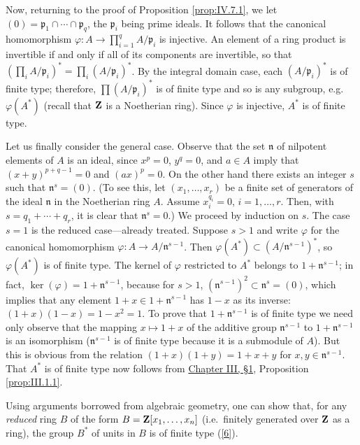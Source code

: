 Now, returning to the proof of Proposition \ref{prop:IV.7.1}, we let
$(0)=\mathfrak{p}_{1}\cap\cdots\cap\mathfrak{p}_{q}$, the $\mathfrak{p}_{i}$
being prime ideals. It follows that the canonical homomorphism
$\varphi:A\to\prod_{i=1}^{q}A/\mathfrak{p}_{i}$ is injective. An element of a
ring product is invertible if and only if all of its components are
invertible, so that
$(\prod_{i}A/\mathfrak{p}_{i})^{*}=\prod_{i}(A/\mathfrak{p}_{i})^{*}$. By
the integral domain case, each $(A/\mathfrak{p}_{i})^{*}$ is of finite type;
therefore, $\prod(A/\mathfrak{p}_{i})^{*}$ is of finite type and so is any
subgroup, e.g.\ $\varphi(A^{*})$ (recall that $\mathbf{Z}$ is a Noetherian ring).
Since $\varphi$ is injective, $A^{*}$ is of finite type.

Let us finally consider the general case. Observe that the set
$\mathfrak{n}$ of nilpotent elements of $A$ is an ideal, since $x^{p}=0$,
$y^{q}=0$, and $a\in A$ imply that $(x+y)^{p+q-1}=0$ and $(ax)^{p}=0$. On
the other hand there exists an integer $s$ such that
$\mathfrak{n}^{s}=(0)$. (To see this, let $(x_{1},\ldots,x_{r})$ be a finite
set of generators of the ideal $\mathfrak{n}$ in the Noetherian ring $A$.
Assume $x_{i}^{q_{i}}=0$, $i=1,\ldots,r$. Then, with
$s=q_{1}+\cdots+q_{r}$, it is clear that $\mathfrak{n}^{s}=0$.) We proceed by
induction on $s$. The case $s=1$ is the reduced case---already treated.
Suppose $s>1$ and write $\varphi$ for the canonical homomorphism
$\varphi:A\to A/\mathfrak{n}^{s-1}$. Then
$\varphi(A^{*})\subset(A/\mathfrak{n}^{s-1})^{*}$, so $\varphi(A^{*})$ is of
finite type. The kernel of $\varphi$ restricted to $A^{*}$ belongs to
$1+\mathfrak{n}^{s-1}$; in fact,
$\ker(\varphi)=1+\mathfrak{n}^{s-1}$, because for $s>1$,
$(\mathfrak{n}^{s-1})^{2}\subset\mathfrak{n}^{s}=(0)$, which implies that
any element $1+x\in1+\mathfrak{n}^{s-1}$ has $1-x$ as its inverse:
$(1+x)(1-x)=1-x^{2}=1$. To prove that $1+\mathfrak{n}^{s-1}$ is of finite
type we need only observe that the mapping $x\mapsto1+x$ of the additive
group $\mathfrak{n}^{s-1}$ to $1+\mathfrak{n}^{s-1}$ is an isomorphism
($\mathfrak{n}^{s-1}$ is of finite type because it is a submodule of $A$).
But this is obvious from the relation $(1+x)(1+y)=1+x+y$ for
$x,y\in\mathfrak{n}^{s-1}$. That $A^{*}$ is of finite type now follows from
\hyperref[sec:3.1]{Chapter III, §1}, Proposition \ref{prop:III.1.1}.

Using arguments borrowed from algebraic geometry, one can show that, for any
\emph{reduced} ring $B$ of the form $B=\mathbf{Z}[x_{1},\ldots,x_{n}]$
(i.e.\ finitely generated over $\mathbf{Z}$ as a ring), the group $B^{*}$ of units
in $B$ is of finite type (\hyperref[bib:6]{[6]}).

